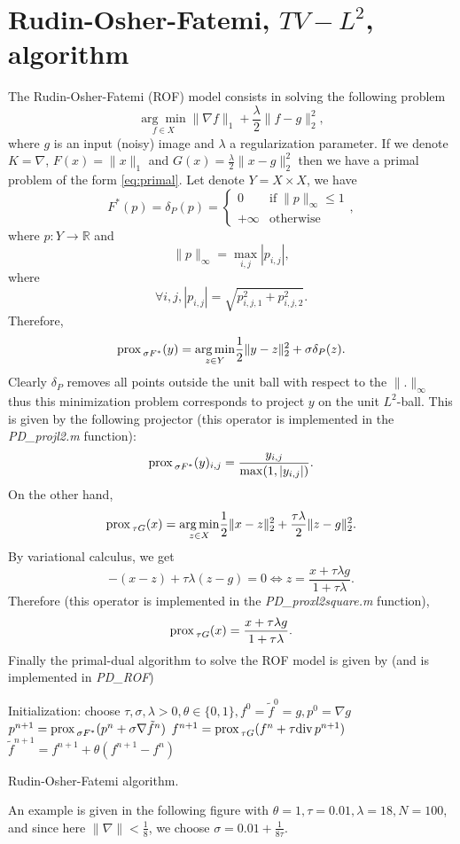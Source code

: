 \documentclass[letter,10pt]{article}
\def\R{{\mathbb{R}}}
\def\Div{\textup{div\,}}
\def\prox{\textup{prox\,}}
\begin{document}
\section{Rudin-Osher-Fatemi, $TV-L^2$, algorithm}\label{sec:rof}
The Rudin-Osher-Fatemi (ROF) model consists in solving the following problem
$$\underset{f\in X}{\arg\min}\|\nabla f\|_1+\frac{\lambda}{2}\|f-g\|_2^2,$$
where $g$ is an input (noisy) image and $\lambda$ a regularization parameter. If we denote $K=\nabla$, $F(x)=\|x\|_1$ and $G(x)=\frac{\lambda}{2}\|x-g\|_2^2$ then we have a primal problem of the form \eqref{eq:primal}. Let denote $Y=X\times X$, we have
$$F^*(p)=\delta_P(p)=\begin{cases} 0\quad&\text{if}\; \|p\|_\infty\leq 1\\ +\infty &\text{otherwise}\end{cases},$$
where $p:Y\to\R$ and $$\|p\|_\infty=\max_{i,j}|p_{i,j}|,$$
where $$\forall i,j,|p_{i,j}|=\sqrt{p_{i,j,1}^2+p_{i,j,2}^2}.$$
Therefore,
$$\prox_{\sigma F^*}(y)=\underset{z\in Y}{\arg\min}\frac{1}{2}\|y-z\|_2^2+\sigma\delta_P(z).$$
Clearly $\delta_P$ removes all points outside the unit ball with respect to the $\|.\|_\infty$ thus this minimization problem corresponds to project $y$ on the unit $L^2$-ball. 
This is given by the following projector (this operator is implemented in the \textit{PD\_projl2.m} function):
$$\prox_{\sigma F^*}(y)_{i,j}=\frac{y_{i,j}}{\max(1,|y_{i,j}|)}.$$
On the other hand,
$$\prox_{\tau G}(x)=\underset{z\in X}{\arg\min}\frac{1}{2}\|x-z\|_2^2+\frac{\tau\lambda}{2}\|z-g\|_2^2.$$
By variational calculus, we get
$$-(x-z)+\tau\lambda(z-g)=0 \Leftrightarrow z=\frac{x+\tau\lambda g}{1+\tau\lambda}.$$
Therefore (this operator is implemented in the \textit{PD\_proxl2square.m} function),
$$\prox_{\tau G}(x)=\frac{x+\tau\lambda g}{1+\tau\lambda}.$$
Finally the primal-dual algorithm to solve the ROF model is given by (and is implemented in \textit{PD\_ROF})
\begin{algorithm}[H]
\begin{algorithmic}
\STATE Initialization: choose $\tau,\sigma,\lambda>0,\theta\in\{0,1\},f^0=\tilde{f}^0=g,p^0=\nabla g$
\REPEAT 
\STATE $p^{n+1}=\prox_{\sigma F^*}(p^n+\sigma \nabla\tilde{f}^n)$
\STATE $f^{n+1}=\prox_{\tau G}(f^n+\tau \Div p^{n+1})$
\STATE $\tilde{f}^{n+1}=f^{n+1}+\theta(f^{n+1}-f^n)$
\end{algorithmic}
\caption{Rudin-Osher-Fatemi algorithm.}
\end{algorithm}
An example is given in the following figure with $\theta=1,\tau=0.01,\lambda=18,N=100$, and since here $\|\nabla\|<\frac{1}{8}$, we choose $\sigma=0.01+\frac{1}{8\tau}$.
\end{document}

